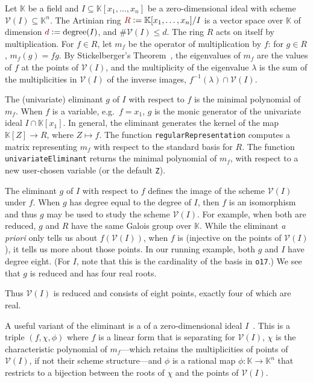 \documentclass[12pt]{amsart}
\theoremstyle{definition}
\newcommand{\KK}{\mathbb{K}}
\newcommand{\calV}{\mathcal{V}}
\newcommand{\defcolor}[1]{{\color{TAMU}#1}}
\newcommand{\demph}[1]{\defcolor{{\sl #1}}}
\begin{document}
Let  $\KK$ be a field and $I\subseteq\KK[x_1,\dotsc,x_n]$ be a zero-dimension\-al ideal  with scheme $\calV(I)\subseteq\KK^n$.
The Artinian ring $\defcolor{R}\vcentcolon=\KK[x_1,\dotsc,x_n]/I$ is a vector space over $\KK$ of dimension
$\defcolor{d}\vcentcolon=\mbox{degree}(I)$, and $\#\calV(I)\leq d$.
The ring $R$ acts on itself by multiplication.
For $f\in R$, let \defcolor{$m_f$} be the operator of multiplication by $f$: for $g\in R$, $m_f(g)=fg$.
By Stickelberger's Theorem~\cite{Cox2021}, the eigenvalues of $m_f$ are the values of $f$ at the  points of $\calV(I)$,
and the multiplicity of the eigenvalue $\lambda$ is the sum of the multiplicities in $\calV(I)$ of the inverse images,
$f^{-1}(\lambda)\cap\calV(I)$. 


The (univariate) \defcolor{eliminant} \defcolor{$g$} of $I$ with respect to $f$ is the minimal polynomial of $m_f$.
When $f$ is a variable, e.g.\ $f=x_1$, $g$ is the monic generator of the univariate ideal $I\cap\KK[x_1]$.
In general, the eliminant generates the kernel of the map $\KK[Z]\to R$, where $Z\mapsto f$.
The function \texttt{regularRepresentation} computes a matrix representing $m_f$ with respect to the standard basis for $R$.
The function \texttt{univariateEliminant} returns the minimal polynomial of $m_f$, with respect to a new user-chosen variable
(or the default \texttt{Z}). 
%
\begin{leftbar}

\end{leftbar}
%
The eliminant \defcolor{$g$} of $I$ with respect to $f$ defines the image of the scheme $\calV(I)$ under $f$.
When $g$ has degree equal to the degree of $I$, then $f$ is an isomorphism and thus $g$ may be used to study the scheme
$\calV(I)$.
For example, when both are reduced, $g$ and $R$ have the same Galois group over $\KK$.
While the eliminant {\it a priori} only tells us about $f(\calV(I))$, when $f$ is \demph{separating} (injective on the
points of $\calV(I)$), it tells us more about those points.
In our running example, both $g$ and $I$ have degree eight. (For $I$, note that this is the cardinality of the basis in \texttt{o17}.)
We see that $g$ is reduced and has four real roots.
%
\begin{leftbar}

\end{leftbar}
%
\noindent Thus $\calV(I)$ is reduced and consists of eight points, exactly four of which are real.

A useful variant of the eliminant is a \demph{rational univariate representation} of a zero-dimension\-al ideal $I$~\cite[Sect.\ 11.4]{BPR}.
This is a triple \defcolor{$(f,\chi,\phi)$} where $f$ is a linear form that is separating for $\calV(I)$, $\chi$ is the characteristic
polynomial of $m_f$---which retains the multiplicities of points of $\calV(I)$, if not their scheme structure---and $\phi$
is a rational map $\phi\colon\KK\to\KK^n$ that restricts to a bijection between the roots of $\chi$ and the points of $\calV(I)$.
%
\begin{leftbar}

\end{leftbar}
%
\end{document}
